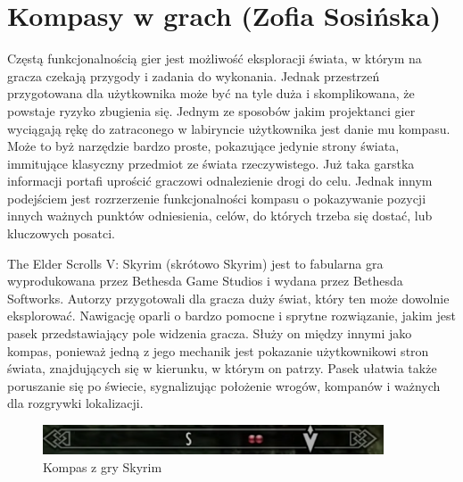 \section{Kompasy w grach (Zofia Sosińska)}\label{chap:skrm}
Częstą funkcjonalnością gier jest możliwość eksploracji świata, w którym na gracza czekają przygody i zadania do wykonania.
Jednak przestrzeń przygotowana dla użytkownika może być na tyle duża i skomplikowana, że powstaje ryzyko 
zbugienia się. Jednym ze sposobów jakim projektanci gier wyciągają rękę do zatraconego w labiryncie użytkownika jest danie mu
kompasu. Może to byż narzędzie bardzo proste, pokazujące jedynie strony świata, immitujące klasyczny przedmiot ze świata rzeczywistego.
Już taka garstka informacji portafi uprościć graczowi odnalezienie drogi do celu. Jednak innym podejściem jest rozrzerzenie 
funkcjonalności kompasu o pokazywanie pozycji innych ważnych punktów odniesienia, celów, do których trzeba się dostać, lub 
kluczowych posatci.

The Elder Scrolls V: Skyrim (skrótowo Skyrim) jest to fabularna gra
wyprodukowana przez Bethesda Game Studios i wydana przez Bethesda Softworks. Autorzy przygotowali dla gracza duży świat,
który ten może dowolnie eksplorować. Nawigację oparli o bardzo pomocne i sprytne rozwiązanie,
jakim jest pasek przedstawiający pole widzenia gracza. Służy on między innymi jako kompas, ponieważ 
jedną z jego mechanik jest pokazanie użytkownikowi stron świata, znajdujących się w kierunku, w którym 
on patrzy. Pasek ułatwia także poruszanie się po świecie, sygnalizując położenie wrogów, kompanów i ważnych 
dla rozgrywki lokalizacji.

\begin{figure}[htbp]
	\centering
	\includegraphics[width=0.9\textwidth]{images/ui/compassSkyrim.png}
	\caption{Kompas z gry Skyrim}\label{fig:Fallout}
\end{figure}

